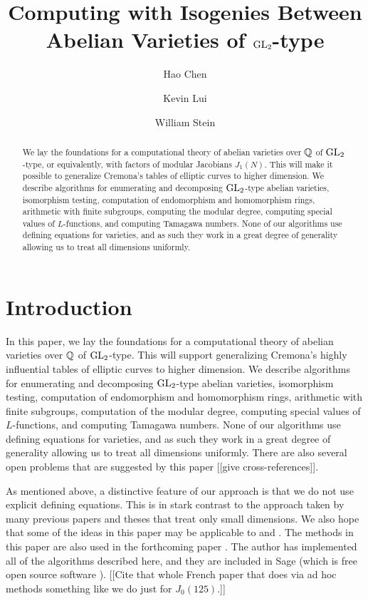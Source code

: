 \documentclass{article}
\title{Computing with Isogenies Between Abelian Varieties of $\operatorname{GL}_2$-type}
\author{Hao Chen \and Kevin Lui \and William Stein}
\begin{document}
\maketitle
\tableofcontents
\begin{abstract}
  We lay the foundations for a computational theory of abelian
  varieties over $\mathbb{Q}$ of $\operatorname{GL}_2$-type, or equivalently, with factors
  of modular Jacobians $J_1(N)$.  This will make it possible to
  generalize Cremona's tables of elliptic curves to higher dimension.
  We describe algorithms for enumerating and decomposing $\operatorname{GL}_2$-type
  abelian varieties, isomorphism testing, computation of endomorphism
  and homomorphism rings, arithmetic with finite subgroups, computing
  the modular degree, computing special values of $L$-functions, and
  computing Tamagawa numbers.  None of our algorithms use defining
  equations for varieties, and as such they work in a great degree of
  generality allowing us to treat all dimensions uniformly.
\end{abstract}


\section{Introduction}
In this paper, we lay the foundations for a computational theory of
abelian varieties over $\mathbb{Q}$ of $\operatorname{GL}_2$-type.  This will support
generalizing Cremona's highly influential tables \cite{cremona:algs}
of elliptic curves to higher dimension.  We describe algorithms for
enumerating and decomposing $\operatorname{GL}_2$-type abelian varieties,
isomorphism testing, computation of endomorphism and homomorphism
rings, arithmetic with finite subgroups, computation of the modular
degree, computing special values of $L$-functions, and computing
Tamagawa numbers.  None of our algorithms use defining equations for
varieties, and as such they work in a great degree of generality
allowing us to treat all dimensions uniformly.  There are also several
open problems that are suggested by this paper [[give
cross-references]].

As mentioned above, a distinctive feature of our approach is that we
do not use explicit defining equations. This is in stark contrast to the
approach taken by many previous papers and theses \cite{empirical}
that treat only small dimensions.  We also hope that some of the ideas
in this paper may be applicable to \cite{MR2282913} and
\cite{jordiquer}.  The methods in this paper are also used in the
forthcoming paper \cite{calegari-stein:eisenstein}.  The author has
implemented all of the algorithms described here, and they are
included in Sage (which is free open source software \cite{sage}).
[[Cite that whole French paper that does via ad hoc methods something
like we do just for $J_0(125)$.]]
\end{document}
